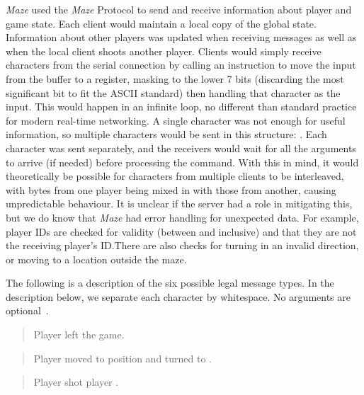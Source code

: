 \textit{Maze} used the \textit{Maze} Protocol to send and receive information about player and game state. Each client would maintain a local copy of the global state. Information about other players was updated when receiving messages as well as when the local client shoots another player. Clients would simply receive characters from the serial connection by calling an instruction to move the input from the buffer to a register, masking to the lower 7 bits (discarding the most significant bit to fit the ASCII standard) then handling that character as the input. This would happen in an infinite loop, no different than standard practice for modern real-time networking. A single character was not enough for useful information, so multiple characters would be sent in this structure: . Each character was sent separately, and the receivers would wait for all the arguments to arrive (if needed) before processing the command. With this in mind, it would theoretically be possible for characters from multiple clients to be interleaved, with bytes from one player being mixed in with those from another, causing unpredictable behaviour. It is unclear if the server had a role in mitigating this, but we do know that \textit{Maze} had error handling for unexpected data. For example, player IDs are checked for validity (between  and  inclusive) and that they are not the receiving player's ID.\@ There are also checks for turning in an invalid direction, or moving to a location outside the maze.

The following is a description of the six possible legal message types. In the description below, we separate each character by whitespace. No arguments are optional~\cite{mazesrc}.

\begin{quote}

  Player  left the game.
\end{quote}

\begin{quote}

  Player  moved to position  and turned to .
\end{quote}

\begin{quote}

  Player  shot player .
\end{quote}

